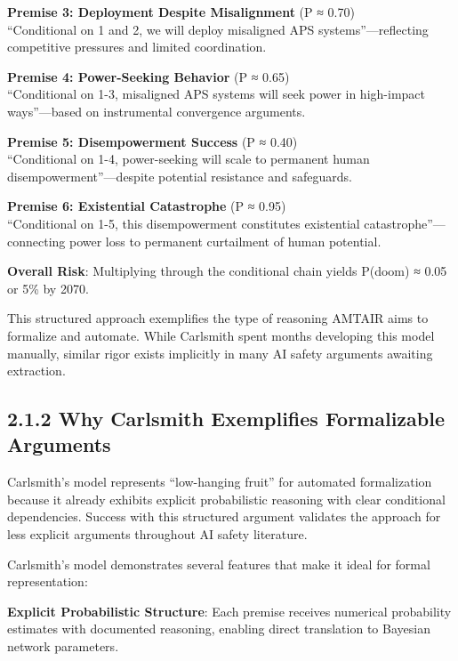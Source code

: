 \documentclass[
  11pt,
  letterpaper,
]{book}
\begin{document}
\textbf{Premise 3: Deployment Despite Misalignment} (P ≈ 0.70)\\
``Conditional on 1 and 2, we will deploy misaligned APS
systems''---reflecting competitive pressures and limited coordination.

\textbf{Premise 4: Power-Seeking Behavior} (P ≈ 0.65)\\
``Conditional on 1-3, misaligned APS systems will seek power in
high-impact ways''---based on instrumental convergence arguments.

\textbf{Premise 5: Disempowerment Success} (P ≈ 0.40)\\
``Conditional on 1-4, power-seeking will scale to permanent human
disempowerment''---despite potential resistance and safeguards.

\textbf{Premise 6: Existential Catastrophe} (P ≈ 0.95)\\
``Conditional on 1-5, this disempowerment constitutes existential
catastrophe''---connecting power loss to permanent curtailment of human
potential.

\textbf{Overall Risk}: Multiplying through the conditional chain yields
P(doom) ≈ 0.05 or 5\% by 2070.

This structured approach exemplifies the type of reasoning AMTAIR aims
to formalize and automate. While Carlsmith spent months developing this
model manually, similar rigor exists implicitly in many AI safety
arguments awaiting extraction.

\subsection*{2.1.2 Why Carlsmith Exemplifies Formalizable
Arguments}\label{sec-carlsmith-formalizable}

Carlsmith's model represents ``low-hanging fruit'' for automated
formalization because it already exhibits explicit probabilistic
reasoning with clear conditional dependencies. Success with this
structured argument validates the approach for less explicit arguments
throughout AI safety literature.

Carlsmith's model demonstrates several features that make it ideal for
formal representation:

\textbf{Explicit Probabilistic Structure}: Each premise receives
numerical probability estimates with documented reasoning, enabling
direct translation to Bayesian network parameters.
\end{document}
